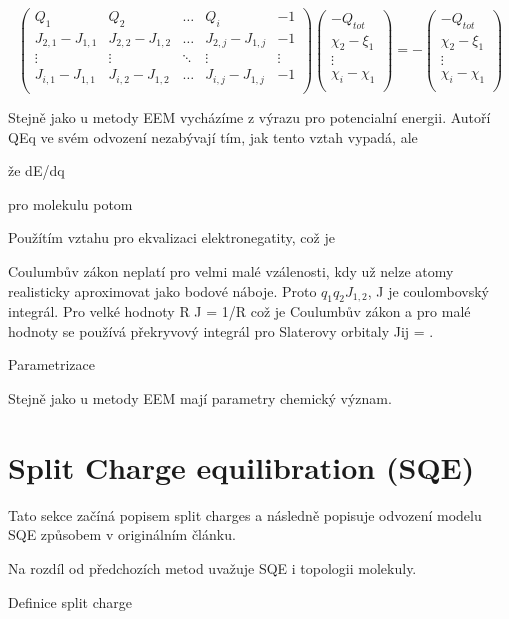 \documentclass[
  color, %
  table, %
  lof,   %
  lot,   %
]{fithesis3}
\begin{document}
\[
\begin{pmatrix}
Q_1 & Q_2 & \dots & Q_i & -1 \\
J_{2,1} - J_{1,1} & J_{2,2} - J_{1,2} & \dots & J_{2,j} - J_{1,j} & -1 \\
\vdots & \vdots & \ddots & \vdots & \vdots \\
J_{i,1} - J_{1,1} & J_{i,2} - J_{1,2} & \dots & J_{i,j} - J_{1,j} & -1 \\
\end{pmatrix}
\begin{pmatrix}
-Q_{tot} \\
\chi_2-\xi_1 \\
\vdots \\
\chi_i-\chi_1 \\
\end{pmatrix}
=
-\begin{pmatrix}
-Q_{tot} \\
\chi_2-\xi_1 \\
\vdots \\
\chi_i-\chi_1 \\
\end{pmatrix}
\]

Stejně jako u metody EEM vycházíme z výrazu pro potencialní energii. Autoří QEq ve svém odvození nezabývají tím, jak tento vztah vypadá, ale 

že dE/dq

pro molekulu potom


Použítím vztahu pro ekvalizaci elektronegatity, což je 

Coulumbův zákon neplatí pro velmi malé vzálenosti, kdy už nelze atomy realisticky aproximovat jako bodové náboje. Proto  $q_1 q_2 J_{1,2}$, J je coulombovský integrál. Pro velké hodnoty R J = 1/R což je Coulumbův zákon a pro malé hodnoty se používá překryvový integrál pro Slaterovy orbitaly Jij = .

Parametrizace

Stejně jako u metody EEM mají parametry chemický význam.

\section{Split Charge equilibration (SQE)}

Tato sekce začíná popisem split charges a následně popisuje odvození modelu SQE způsobem v originálním článku.

Na rozdíl od předchozích metod uvažuje SQE i topologii molekuly.

Definice split charge
\end{document}

